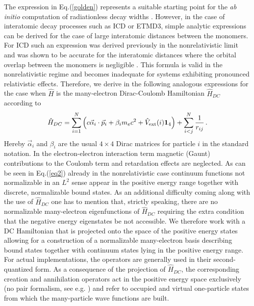 The expression in Eq.(\ref{golden}) represents a suitable starting point for
the {\it ab initio} computation of radiationless decay widths \cite{Aaberg82,Averbukh09_2}.
However, in the case of interatomic decay processes such as ICD or ETMD3,
simple analytic expressions can be derived for the case of large interatomic
distances between the monomers. For ICD such an expression was derived previously
in the nonrelativistic limit and was shown to be accurate for the interatomic
distances where the orbital overlap between the monomers is
negligible \cite{Averbukh04,Gokhberg10_1}. This formula is valid in the nonrelativistic
regime and becomes inadequate for systems exhibiting pronounced relativistic effects.
Therefore, we derive in the following analogous expressions for the case
when $\hat{H}$ is the many-electron Dirac-Coulomb Hamiltonian $\hat{H}_{DC}$ according
to
\begin{equation}
    \hat{H}_{DC}=\sum_{i=1}^N\left(c\vec{\alpha}_i\cdot\vec{p}_i + \beta_i m_ec^2 +
   \hat{V}_{\rm ext}(i){\bf{1}}_4\right) + \sum_{i<j}^N\frac{1}{r_{ij}}\, .
\end{equation}
Hereby $\vec{\alpha}_i$ and $\beta_i$ are the usual $4\times 4$ Dirac matrices
for particle $i$ in the standard notation.
In the electron-electron interaction term magnetic (Gaunt) contributions to
the Coulomb term and retardation effects are neglected. As can be seen in
Eq.(\ref{eq2}) already in the nonrelativistic case continuum functions not
normalizable in an $L^2$ sense appear in the positive energy range together with
discrete, normalizable bound states. As an additional difficulty coming along with
the use of $\hat{H}_{DC}$ one has to mention that, strictly speaking, there are no
normalizable many-electron eigenfunctions of $\hat{H}_{DC}$
\cite{brown51, sucher80, pestka2006, bylicki2008} requiring the extra condition
that the negative energy eigenstates be not accessible. We therefore work with a
DC Hamiltonian that is projected onto the space of the positive energy states
allowing for a construction of a normalizable many-electron basis describing
bound states together with continuum states lying in the positive energy range.
For actual implementations, the operators are generally used in their second-quantized
form. As a consequence of the projection of $\hat{H}_{DC}$, the corresponding
creation and annihilation operators act in the positive energy space exclusively
(no pair formalism, see e.g. \cite{grant88}) and refer to occupied and virtual
one-particle states from which the many-particle wave functions are built.


